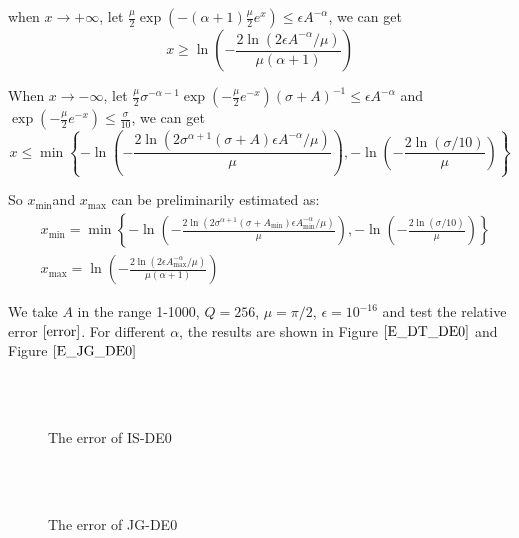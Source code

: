 when $x\rightarrow +\infty$, let $\frac{\mu}{2} \exp(-(\alpha+1)\frac{\mu}{2}e^x)\leq \epsilon A^{-\alpha}$, we can get
\begin{equation}
x\geq \ln\left(-\frac{2\ln(2\epsilon A^{-\alpha}/\mu)}{\mu(\alpha+1)}\right)
\end{equation}


When $x\rightarrow -\infty$, let $\frac{\mu}{2}\sigma^{-\alpha-1}\exp(-\frac{\mu}{2} e^{-x})(\sigma+A)^{-1}\leq \epsilon A^{-\alpha}$ and $\exp(-\frac{\mu}{2}e^{-x})\le \frac{\sigma}{10}$, we can get
\begin{equation}
x\leq \min \left\{-\ln\left(-\frac{2\ln(2\sigma^{\alpha+1}(\sigma+A)\epsilon A^{-\alpha}/\mu)}{\mu}\right),-\ln \left(-\frac{2\ln(\sigma/10)}{\mu}\right)\right\}
\end{equation}


So  $x_{\min}$and $x_{\max}$ can be preliminarily estimated as:
\begin{equation}\begin{aligned}&x_{\min}=\min \left\{-\ln\left(-\frac{2\ln(2\sigma^{\alpha+1}(\sigma+A_{\min})\epsilon A_{\min}^{-\alpha}/\mu)}{\mu}\right),-\ln \left(-\frac{2\ln(\sigma/10)}{\mu}\right)\right\}
\\&x_{\max}=\ln\left(-\frac{2\ln(2\epsilon A_{\max}^{-\alpha}/\mu)}{\mu(\alpha+1)}\right)
\end{aligned}\end{equation}


We take $A$ in the range 1-1000, $Q=256$, $\mu=\pi/2$, $\epsilon=10^{-16}$ and test the relative error $\eqref{error}$. For different $\alpha $, the results are shown in Figure $\ref{E_DT_DE0}$ and Figure $\ref{E_JG_DE0}$ 

\begin{figure}[htbp]
\centering
{}
~~
~~
\\
~~
~~
 \caption{The error of IS-DE0}
  \label{E_DT_DE0}
\end{figure}

\begin{figure}[htbp]
\centering
{}
~~
~~
\\
~~
~~
 \caption{The error of JG-DE0}
  \label{E_JG_DE0}
\end{figure}


